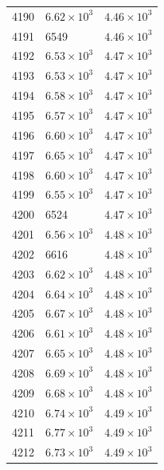 \begin{table}[H]
\begin{tabular}{lll}
4190 & $\displaystyle 6.62 \times 10^{3}$ & $\displaystyle 4.46 \times 10^{3}$ \\
4191 & 6549 & $\displaystyle 4.46 \times 10^{3}$ \\
4192 & $\displaystyle 6.53 \times 10^{3}$ & $\displaystyle 4.47 \times 10^{3}$ \\
4193 & $\displaystyle 6.53 \times 10^{3}$ & $\displaystyle 4.47 \times 10^{3}$ \\
4194 & $\displaystyle 6.58 \times 10^{3}$ & $\displaystyle 4.47 \times 10^{3}$ \\
4195 & $\displaystyle 6.57 \times 10^{3}$ & $\displaystyle 4.47 \times 10^{3}$ \\
4196 & $\displaystyle 6.60 \times 10^{3}$ & $\displaystyle 4.47 \times 10^{3}$ \\
4197 & $\displaystyle 6.65 \times 10^{3}$ & $\displaystyle 4.47 \times 10^{3}$ \\
4198 & $\displaystyle 6.60 \times 10^{3}$ & $\displaystyle 4.47 \times 10^{3}$ \\
4199 & $\displaystyle 6.55 \times 10^{3}$ & $\displaystyle 4.47 \times 10^{3}$ \\
4200 & 6524 & $\displaystyle 4.47 \times 10^{3}$ \\
4201 & $\displaystyle 6.56 \times 10^{3}$ & $\displaystyle 4.48 \times 10^{3}$ \\
4202 & 6616 & $\displaystyle 4.48 \times 10^{3}$ \\
4203 & $\displaystyle 6.62 \times 10^{3}$ & $\displaystyle 4.48 \times 10^{3}$ \\
4204 & $\displaystyle 6.64 \times 10^{3}$ & $\displaystyle 4.48 \times 10^{3}$ \\
4205 & $\displaystyle 6.67 \times 10^{3}$ & $\displaystyle 4.48 \times 10^{3}$ \\
4206 & $\displaystyle 6.61 \times 10^{3}$ & $\displaystyle 4.48 \times 10^{3}$ \\
4207 & $\displaystyle 6.65 \times 10^{3}$ & $\displaystyle 4.48 \times 10^{3}$ \\
4208 & $\displaystyle 6.69 \times 10^{3}$ & $\displaystyle 4.48 \times 10^{3}$ \\
4209 & $\displaystyle 6.68 \times 10^{3}$ & $\displaystyle 4.48 \times 10^{3}$ \\
4210 & $\displaystyle 6.74 \times 10^{3}$ & $\displaystyle 4.49 \times 10^{3}$ \\
4211 & $\displaystyle 6.77 \times 10^{3}$ & $\displaystyle 4.49 \times 10^{3}$ \\
4212 & $\displaystyle 6.73 \times 10^{3}$ & $\displaystyle 4.49 \times 10^{3}$ \\

\end{tabular}
\end{table}
